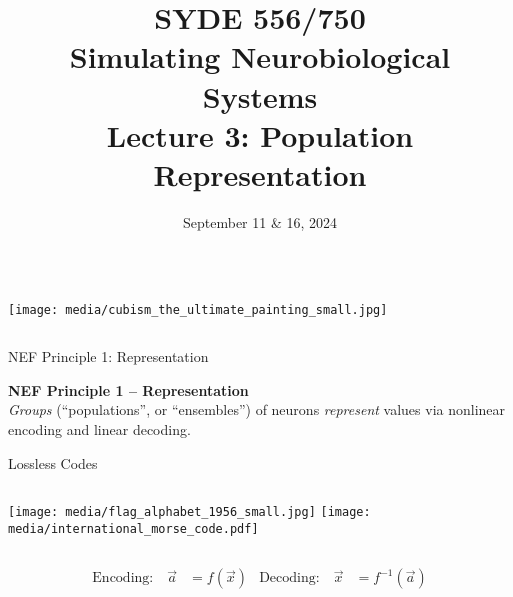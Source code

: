 \documentclass[handout,aspectratio=169]{beamer}
\date{September 11 \& 16, 2024}
\title{SYDE 556/750 \\ Simulating Neurobiological Systems \\ Lecture 3: Population Representation}
\begin{document}
	
\begin{frame}{}
	\vspace{0.5cm}
	\begin{columns}[c]
		\MakeTitle
		\texttt{[image: media/cubism\_the\_ultimate\_painting\_small.jpg]}
	\end{columns}
\end{frame}



\begin{frame}{NEF Principle 1: Representation}
	\begin{mdframed}
		\textbf{NEF Principle 1 -- Representation}\\
		\emph{Groups} (\enquote{populations}, or \enquote{ensembles}) of neurons \emph{represent} values via nonlinear encoding and linear decoding.
	\end{mdframed}
\end{frame}

\begin{frame}{Lossless Codes}
	\vspace{0.5cm}
	\begin{columns}
		\texttt{[image: media/flag\_alphabet\_1956\_small.jpg]}
		\texttt{[image: media/international\_morse\_code.pdf]}
	\end{columns}
	\vspace{0.25cm}
	\begin{align*}
		\text{Encoding:} \quad \vec a &= f(\vec x) & \text{Decoding:} \quad \vec x &= f^{-1}(\vec a)
	\end{align*}
\end{frame}
\end{document}
